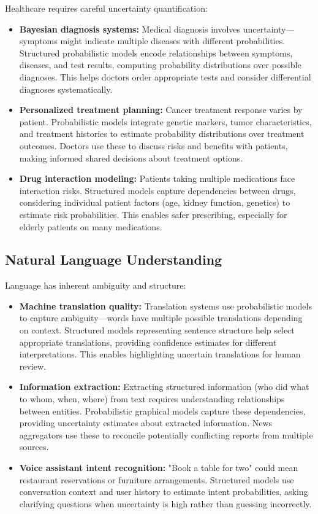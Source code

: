 Healthcare requires careful uncertainty quantification:

\begin{itemize}
    \item \textbf{Bayesian diagnosis systems:} Medical diagnosis involves uncertainty—symptoms might indicate multiple diseases with different probabilities. Structured probabilistic models encode relationships between symptoms, diseases, and test results, computing probability distributions over possible diagnoses. This helps doctors order appropriate tests and consider differential diagnoses systematically.
    
    \item \textbf{Personalized treatment planning:} Cancer treatment response varies by patient. Probabilistic models integrate genetic markers, tumor characteristics, and treatment histories to estimate probability distributions over treatment outcomes. Doctors use these to discuss risks and benefits with patients, making informed shared decisions about treatment options.
    
    \item \textbf{Drug interaction modeling:} Patients taking multiple medications face interaction risks. Structured models capture dependencies between drugs, considering individual patient factors (age, kidney function, genetics) to estimate risk probabilities. This enables safer prescribing, especially for elderly patients on many medications.
\end{itemize}

\subsection{Natural Language Understanding}

Language has inherent ambiguity and structure:

\begin{itemize}
    \item \textbf{Machine translation quality:} Translation systems use probabilistic models to capture ambiguity—words have multiple possible translations depending on context. Structured models representing sentence structure help select appropriate translations, providing confidence estimates for different interpretations. This enables highlighting uncertain translations for human review.
    
    \item \textbf{Information extraction:} Extracting structured information (who did what to whom, when, where) from text requires understanding relationships between entities. Probabilistic graphical models capture these dependencies, providing uncertainty estimates about extracted information. News aggregators use these to reconcile potentially conflicting reports from multiple sources.
    
    \item \textbf{Voice assistant intent recognition:} "Book a table for two" could mean restaurant reservations or furniture arrangements. Structured models use conversation context and user history to estimate intent probabilities, asking clarifying questions when uncertainty is high rather than guessing incorrectly.
\end{itemize}

